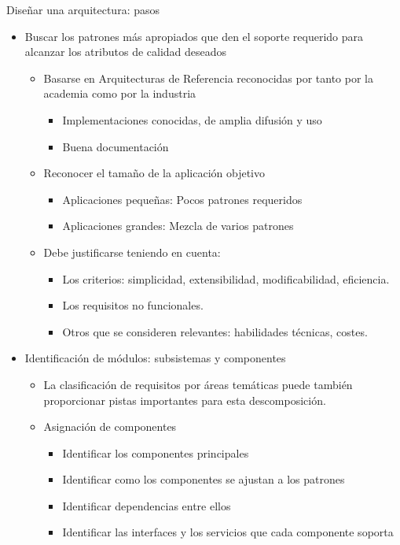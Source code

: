 \documentclass[12pt, twoside, openright]{report} %
\begin{document}
Diseñar una arquitectura: pasos

\begin{itemize}
	\item Buscar los patrones más apropiados que den el soporte requerido
		para alcanzar los atributos de calidad deseados
		\begin{itemize}
			\item Basarse en Arquitecturas de Referencia reconocidas por tanto por
			la academia como por la industria
 			\begin{itemize}
		
				\item
					Implementaciones conocidas, de amplia difusión y uso
				\item
					Buena documentación
			\end{itemize}
			\item Reconocer el tamaño de la aplicación objetivo
			\begin{itemize}
				\item
					Aplicaciones pequeñas: Pocos patrones requeridos
				\item
					Aplicaciones grandes: Mezcla de varios patrones
			\end{itemize}
			\pagebreak

			\item Debe justificarse teniendo en cuenta:
			\begin{itemize}
				\item
					Los criterios: simplicidad, extensibilidad, modificabilidad,
					eficiencia.
				\item
					Los requisitos no funcionales.
				\item
					Otros que se consideren relevantes: habilidades técnicas,
					costes.
			\end{itemize}
		\end{itemize}
	\item Identificación de módulos: subsistemas y componentes
		\begin{itemize}
			\item
			La clasificación de requisitos por áreas temáticas puede también
			proporcionar pistas importantes para esta descomposición.
			\item
			Asignación de componentes
			\begin{itemize}
				\item
					Identificar los componentes principales
				\item
					Identificar como los componentes se ajustan a los patrones
				\item
					Identificar dependencias entre ellos
				\item
					Identificar las interfaces y los servicios que cada componente
					soporta
			\end{itemize}
		\end{itemize}
\end{itemize}
\end{document}
